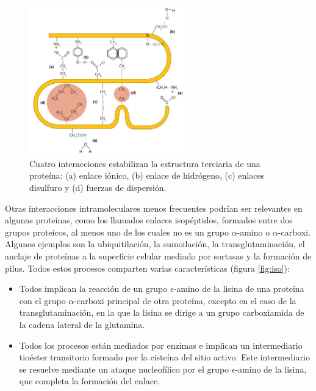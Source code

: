 \begin{figure}[h]
\centering
\includegraphics[width = 0.6\textwidth]{figs/interactions-01.png}
\caption{Cuatro interacciones estabilizan la estructura terciaria de una proteína: (a) enlace iónico, (b) enlace de hidrógeno, (c) enlaces disulfuro y (d) fuerzas de dispersión.}
\label{fig:interactions}
\end{figure}

Otras interacciones intramoleculares menos frecuentes podrían ser relevantes en algunas proteínas, como los llamados enlaces isopéptidos, formados entre dos grupos proteicos, al menos uno de los cuales no es un grupo $\alpha$-amino o $\alpha$-carboxi. Algunos ejemplos son la ubiquitilación, la sumoilación, la transglutaminación, el anclaje de proteínas a la superficie celular mediado por sortasas y la formación de pilus. Todos estos procesos comparten varias características (figura \ref{fig:iso}):
\begin{itemize}
\item Todos implican la reacción de un grupo $\epsilon$-amino de la lisina de una proteína con el grupo $\alpha$-carboxi principal de otra proteína, excepto en el caso de la transglutaminación, en la que la lisina se dirige a un grupo carboxiamida de la cadena lateral de la glutamina.
\item Todos los procesos están mediados por enzimas e implican un intermediario tioéster transitorio formado por la cisteína del sitio activo. Este intermediario se resuelve mediante un ataque nucleofílico por el grupo $\epsilon$-amino de la lisina, que completa la formación del enlace.
\end{itemize}

